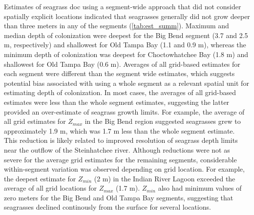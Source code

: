 \documentclass[letterpaper,12pt,oneside]{article}\usepackage[]{graphicx}\usepackage[]{color}
\begin{document}
Estimates of seagrass \ac{doc} using a segment-wide approach that did not consider spatially explicit locations indicated that seagrasses generally did not grow deeper than three meters in any of the segments (\cref{tab:est_summ}).  Maximum and median depth of colonization were deepest for the Big Bend segment (3.7 and 2.5 m, respectively) and shallowest for Old Tampa Bay (1.1 and 0.9 m), whereas the minimum depth of colonization was deepest for Choctowhatchee Bay (1.8 m) and shallowest for Old Tampa Bay (0.6 m).  Averages of all grid-based estimates for each segment were different than the segment wide estimates, which suggests potential bias associated with using a whole segment as a relevant spatial unit for estimating depth of colonization.  In most cases, the averages of all grid-based estimates were less than the whole segment estimates, suggesting the latter provided an over-estimate of seagrass growth limits.  For example, the average of all grid estimates for $Z_{max}$ in the Big Bend region suggested seagrasses grew to approximately 1.9 m, which was 1.7 m less than the whole segment estimate.  This reduction is likely related to improved resolution of seagrass depth limits near the outflow of the Steinhatchee river.  Although reductions were not as severe for the average grid estimates for the remaining segments, considerable within-segment variation was observed depending on grid location.  For example, the deepest estimate for $Z_{min}$ (2 m) in the Indian River Lagoon exceeded the average of all grid locations for $Z_{max}$ (1.7 m).  $Z_{min}$ also had minimum values of zero meters for the Big Bend and Old Tampa Bay segments, suggesting that seagrasses declined continously from the surface for several locations.   
\end{document}
